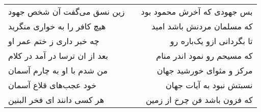 \begin{center}
\begin{longtable}{l p{0.5cm} r}
\\
زین نسق می‌گفت آن شخص جهود
&&
بس جهودی که آخرش محمود بود
\\
هیچ کافر را به خواری منگرید
&&
که مسلمان مردنش باشد امید
\\
چه خبر داری ز ختم عمر او
&&
تا بگردانی ازو یک‌باره رو
\\
بعد از ان ترسا در آمد در کلام
&&
که مسیحم رو نمود اندر منام
\\
من شدم با او به چارم آسمان
&&
مرکز و مثوای خورشید جهان
\\
خود عجب‌های قلاع آسمان
&&
نسبتش نبود به آیات جهان
\\
هر کسی دانند ای فخر البنین
&&
که فزون باشد فن چرخ از زمین
\\
\end{longtable}
\end{center}
